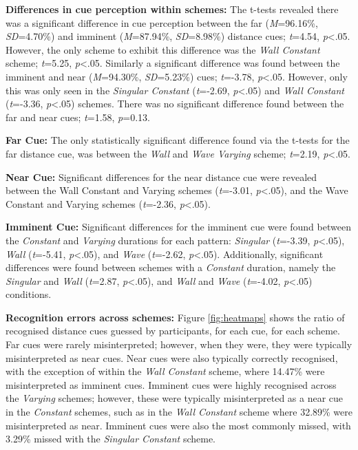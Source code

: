 \documentclass{mpaper}
\begin{document}
\textbf{Differences in cue perception within schemes:} The t-tests revealed there was a significant difference in cue perception between the far (\textit{M}=96.16\%, \textit{SD}=4.70\%) and imminent (\textit{M}=87.94\%, \textit{SD}=8.98\%) distance cues; \textit{t}=4.54, \textit{p}<.05. However, the only scheme to exhibit this difference was the \textit{Wall Constant} scheme; \textit{t}=5.25, \textit{p}<.05. Similarly a significant difference was found between the imminent and near (\textit{M}=94.30\%, \textit{SD}=5.23\%) cues; \textit{t}=-3.78, \textit{p}<.05. However, only this was only seen in the \textit{Singular Constant} (\textit{t}=-2.69, \textit{p}<.05) and \textit{Wall Constant} (\textit{t}=-3.36, \textit{p}<.05) schemes. There was no significant difference found between the far and near cues; \textit{t}=1.58, \textit{p}=0.13.

\textbf{Far Cue:} The only statistically significant difference found via the t-tests for the far distance cue, was between the \textit{Wall} and \textit{Wave Varying} scheme; \textit{t}=2.19, \textit{p}<.05.

\textbf{Near Cue:} Significant differences for the near distance cue were revealed between the Wall Constant and Varying schemes (\textit{t}=-3.01, \textit{p}<.05), and the Wave Constant and Varying schemes (\textit{t}=-2.36, \textit{p}<.05). 

\textbf{Imminent Cue:} Significant differences for the imminent cue were found between the \textit{Constant} and \textit{Varying} durations for each pattern: \textit{Singular} (\textit{t}=-3.39, \textit{p}<.05), \textit{Wall} (\textit{t}=-5.41, \textit{p}<.05), and \textit{Wave} (\textit{t}=-2.62, \textit{p}<.05). Additionally, significant differences were found between schemes with a \textit{Constant} duration, namely the \textit{Singular} and \textit{Wall} (\textit{t}=2.87, \textit{p}<.05), and \textit{Wall} and \textit{Wave} (\textit{t}=-4.02, \textit{p}<.05) conditions.

\textbf{Recognition errors across schemes:} Figure \ref{fig:heatmaps} shows the ratio of recognised distance cues guessed by participants, for each cue, for each scheme. Far cues were rarely misinterpreted; however, when they were, they were typically misinterpreted as near cues. Near cues were also typically correctly recognised, with the exception of within the \textit{Wall Constant} scheme, where 14.47\% were misinterpreted as imminent cues. Imminent cues were highly recognised across the \textit{Varying} schemes; however, these were typically misinterpreted as a near cue in the \textit{Constant} schemes, such as in the \textit{Wall Constant} scheme where 32.89\% were misinterpreted as near. Imminent cues were also the most commonly missed, with 3.29\% missed with the \textit{Singular Constant} scheme. 
\end{document}
